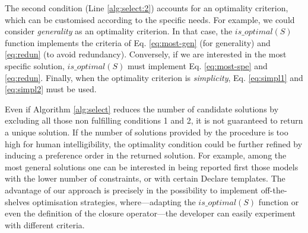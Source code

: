%
The second condition (Line \ref{alg:select:2}) accounts for an optimality criterion, which can be customised according to the specific needs. 
%
For example, we could consider \emph{generality} as an optimality criterion. In that case, the $is\_optimal(S)$ function implements the criteria of Eq. \eqref{eq:most-gen} (for generality) and \eqref{eq:redun} (to avoid redundancy).
Conversely, if we are interested in the most specific solution, $is\_optimal(S)$ must implement Eq. \eqref{eq:most-spe} and \eqref{eq:redun}.
Finally, when the optimality criterion is \emph{simplicity}, Eq. \eqref{eq:simpl1} and \eqref{eq:simpl2} must be used.

%
%
%


Even if Algorithm \ref{alg:select} reduces the number of candidate solutions by excluding all those non fulfilling conditions 1 and 2, it is not guaranteed to return a unique solution. If the number of solutions provided by the procedure is too high for human intelligibility, the optimality condition could be further refined by inducing a preference order in the returned solution. For example, among the most general solutions one can be interested in being reported first those models with the lower number of constraints, or with certain Declare templates. The advantage of our approach is precisely in the possibility to implement off-the-shelves optimisation strategies, where---adapting the $is\_optimal(S)$ function or even the definition of the closure operator---the developer can easily experiment with different criteria.

